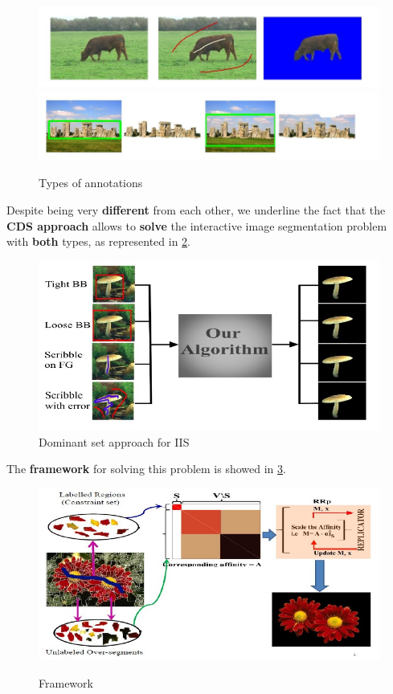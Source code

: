 \begin{figure}[h!]
    \centering
    \includegraphics[scale = 1.5]{img/interactive image segmentation.jpg}
    \includegraphics[scale = 1.5]{img/interactive image segmentation1.jpg}
    \label{iis1}
    \caption{Types of annotations}
\end{figure}

Despite being very \textbf{different} from each other, we underline the fact that the \textbf{CDS approach} allows to \textbf{solve} the interactive image segmentation problem with \textbf{both} types, as represented in \ref{iis2}.

 \begin{figure}[h!]
    \centering
    \label{iis2}
    \includegraphics[scale = 1.5]{img/interactive image segmentation2.jpg}
    \caption{Dominant set approach for IIS}
\end{figure}

The \textbf{framework} for solving this problem is showed in \ref{iis3}.

\begin{figure}[h!]
    \centering
    \includegraphics[scale = 1.7]{img/interactive image segmentation3.jpg}
    \label{iis3}
    \caption{Framework}
\end{figure}

